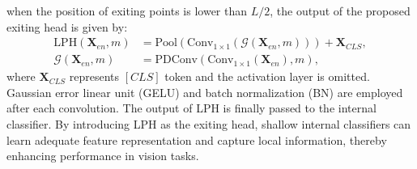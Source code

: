 when the position of exiting points is lower than $L/2$, the output of the proposed exiting head is given by: 
\begin{equation}
  \begin{aligned}
    \text{LPH}(\mathbf{X}_{en}, m)&=\text{Pool}(\text{Conv}_{1\times 1}(\mathcal{G}(\mathbf{X}_{en}, m) ) )+\mathbf{X}_{CLS}, \\
    \mathcal{G}(\mathbf{X}_{en}, m)&=\text{PDConv}(\text{Conv}_{1\times 1}(\mathbf{X}_{en}), m),
  \end{aligned}
\end{equation}
where $\mathbf{X}_{CLS}$ represents $[CLS]$ token and the activation layer is omitted. 
Gaussian error linear unit (GELU) and batch normalization (BN) are employed after each convolution.
The output of LPH is finally passed to the internal classifier. 
By introducing LPH as the exiting head, shallow internal classifiers can learn adequate feature representation and capture local information, thereby enhancing performance in vision tasks. 

